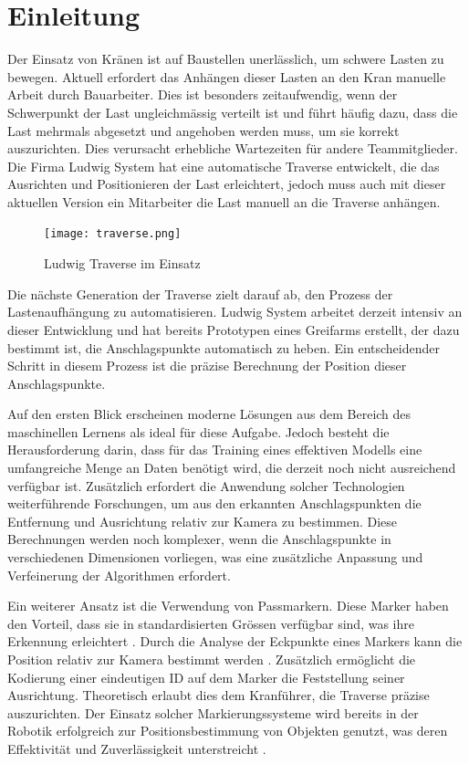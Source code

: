 \section{Einleitung}

Der Einsatz von Kränen ist auf Baustellen unerlässlich, um schwere Lasten zu bewegen.
Aktuell erfordert das Anhängen dieser Lasten an den Kran manuelle Arbeit durch Bauarbeiter.
Dies ist besonders zeitaufwendig, wenn der Schwerpunkt der Last ungleichmässig verteilt ist 
und führt häufig dazu, dass die Last mehrmals abgesetzt und angehoben werden muss, um sie 
korrekt auszurichten. Dies verursacht erhebliche Wartezeiten für andere Teammitglieder. 
Die Firma Ludwig System hat eine automatische Traverse entwickelt, die das Ausrichten und 
Positionieren der Last erleichtert, jedoch muss auch mit dieser aktuellen Version ein Mitarbeiter 
die Last manuell an die Traverse anhängen.

\begin{figure}[H]
    \centering
    \texttt{[image: traverse.png]}
    \caption{Ludwig Traverse im Einsatz}
\end{figure}

Die nächste Generation der Traverse zielt darauf ab, den Prozess der Lastenaufhängung zu automatisieren.
Ludwig System arbeitet derzeit intensiv an dieser Entwicklung und hat bereits Prototypen eines Greifarms 
erstellt, der dazu bestimmt ist, die Anschlagspunkte automatisch zu heben. Ein entscheidender Schritt in diesem 
Prozess ist die präzise Berechnung der Position dieser Anschlagspunkte.

Auf den ersten Blick erscheinen moderne Lösungen aus dem Bereich des maschinellen Lernens als ideal für diese Aufgabe. 
Jedoch besteht die Herausforderung darin, dass für das Training eines effektiven Modells eine umfangreiche Menge an Daten 
benötigt wird, die derzeit noch nicht ausreichend verfügbar ist. Zusätzlich erfordert die Anwendung solcher Technologien weiterführende 
Forschungen, um aus den erkannten Anschlagspunkten die Entfernung und Ausrichtung relativ zur Kamera zu bestimmen. Diese Berechnungen werden 
noch komplexer, wenn die Anschlagspunkte in verschiedenen Dimensionen vorliegen, was eine zusätzliche Anpassung und Verfeinerung der Algorithmen 
erfordert.

Ein weiterer Ansatz ist die Verwendung von Passmarkern. Diese Marker haben den Vorteil, dass sie in standardisierten Grössen verfügbar sind, was 
ihre Erkennung erleichtert \cite{astrobee2023}. Durch die Analyse der Eckpunkte eines Markers kann die Position relativ zur Kamera bestimmt werden 
\cite{localizationSystem}. Zusätzlich ermöglicht die Kodierung einer eindeutigen ID auf dem Marker die Feststellung seiner Ausrichtung. Theoretisch
erlaubt dies dem Kranführer, die Traverse präzise auszurichten. Der Einsatz solcher Markierungssysteme wird bereits in der Robotik erfolgreich zur 
Positionsbestimmung von Objekten genutzt, was deren Effektivität und Zuverlässigkeit unterstreicht \cite{localizationSystem}.


